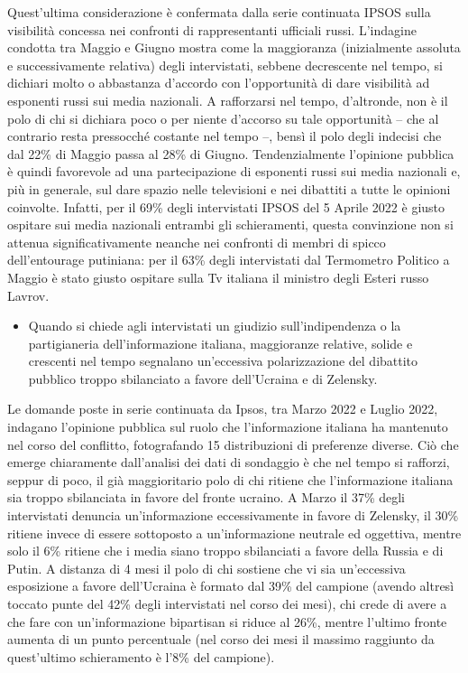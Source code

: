 \documentclass[
]{book}
\providecommand{\tightlist}{%
  \setlength{\itemsep}{0pt}\setlength{\parskip}{0pt}}
\begin{document}
Quest'ultima considerazione è confermata dalla serie continuata IPSOS sulla visibilità concessa nei confronti di rappresentanti ufficiali russi. L'indagine condotta tra Maggio e Giugno mostra come la maggioranza (inizialmente assoluta e successivamente relativa) degli intervistati, sebbene decrescente nel tempo, si dichiari molto o abbastanza d'accordo con l'opportunità di dare visibilità ad esponenti russi sui media nazionali. A rafforzarsi nel tempo, d'altronde, non è il polo di chi si dichiara poco o per niente d'accorso su tale opportunità -- che al contrario resta pressocché costante nel tempo --, bensì il polo degli indecisi che dal 22\% di Maggio passa al 28\% di Giugno.
Tendenzialmente l'opinione pubblica è quindi favorevole ad una partecipazione di esponenti russi sui media nazionali e, più in generale, sul dare spazio nelle televisioni e nei dibattiti a tutte le opinioni coinvolte. Infatti, per il 69\% degli intervistati IPSOS del 5 Aprile 2022 è giusto ospitare sui media nazionali entrambi gli schieramenti, questa convinzione non si attenua significativamente neanche nei confronti di membri di spicco dell'entourage putiniana: per il 63\% degli intervistati dal Termometro Politico a Maggio è stato giusto ospitare sulla Tv italiana il ministro degli Esteri russo Lavrov.

\begin{itemize}
\tightlist
\item
  Quando si chiede agli intervistati un giudizio sull'indipendenza o la partigianeria dell'informazione italiana, maggioranze relative, solide e crescenti nel tempo segnalano un'eccessiva polarizzazione del dibattito pubblico troppo sbilanciato a favore dell'Ucraina e di Zelensky.
\end{itemize}

Le domande poste in serie continuata da Ipsos, tra Marzo 2022 e Luglio 2022, indagano l'opinione pubblica sul ruolo che l'informazione italiana ha mantenuto nel corso del conflitto, fotografando 15 distribuzioni di preferenze diverse. Ciò che emerge chiaramente dall'analisi dei dati di sondaggio è che nel tempo si rafforzi, seppur di poco, il già maggioritario polo di chi ritiene che l'informazione italiana sia troppo sbilanciata in favore del fronte ucraino. A Marzo il 37\% degli intervistati denuncia un'informazione eccessivamente in favore di Zelensky, il 30\% ritiene invece di essere sottoposto a un'informazione neutrale ed oggettiva, mentre solo il 6\% ritiene che i media siano troppo sbilanciati a favore della Russia e di Putin. A distanza di 4 mesi il polo di chi sostiene che vi sia un'eccessiva esposizione a favore dell'Ucraina è formato dal 39\% del campione (avendo altresì toccato punte del 42\% degli intervistati nel corso dei mesi), chi crede di avere a che fare con un'informazione bipartisan si riduce al 26\%, mentre l'ultimo fronte aumenta di un punto percentuale (nel corso dei mesi il massimo raggiunto da quest'ultimo schieramento è l'8\% del campione).
\end{document}
